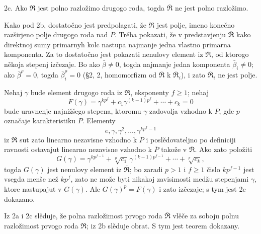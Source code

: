 \documentclass[11pt]{article}
\begin{document}
\setcounter{footnote}{22}

2c. Ako $\mathfrak R$ jest polno razložimo drugogo roda, togda $\overline{\mathfrak R}$ ne jest polno razložimo.

Kako pod 2b, dostatočno jest predpolagati, že $\mathfrak R$ jest polje, imeno konečno razširjeno polje drugogo roda nad $P$. Trěba pokazati, že v predstavjenju $\overline{\mathfrak R}$ kako direktnoj sumy primarnyh kolc nastupa najmanje jedna vlastno primarna komponenta. Za to dostatočno jest pokazati nenulovy element iz $\overline{\mathfrak R}$, od ktorogo někoja stepenj izčezaje. Bo ako $\bar\beta\ne0$, togda najmanje jedna komponenta $\bar\beta_i\ne0$; ako $\bar\beta^\rho=0$, togda $\bar\beta_i^\rho=0$ (\S 2, 2, homomorfizm od $\overline{\mathfrak R}$ k $\overline{\mathfrak R}_i$), i zato $\overline{\mathfrak R}_i$ ne jest polje.

Nehaj $\gamma$ bude element drugogo roda iz $\mathfrak R$, eksponenty $f\ge 1$; nehaj
\[
        F(\gamma)=\gamma^{kp^f}+c_1\gamma^{(k-1)p^f}+\cdots+c_k=0
\]
bude uravnenje najnižšego stepena, ktoromu $\gamma$ zadovolja vzhodno k $P$, gde $p$ označaje karakteristiku $P$. Elementy
\[
        e,\gamma,\gamma^2,\ldots,\gamma^{kp^f-1}
\]
iz $\mathfrak R$ sut zato linearno nezavisne vzhodno k $P$ i poslědovateljno po definiciji ravnosti ostavajut linearno nezavisne vzhodno k $\overline P$ takože v $\overline{\mathfrak R}$. Ako zato položiti
\[
        G(\gamma)=\gamma^{kp^{f-1}}+\sqrt[p]{c_1}\,\gamma^{(k-1)p^{f-1}}
        +\cdots+\sqrt[p]{c_k},
\]
togda $G(\gamma)$ jest nenulovy element iz $\overline{\mathfrak R}$; bo zaradi $p>1$ i $f\ge1$ čislo $kp^{f-1}$ jest vsegda menše než $kp^f$, zato ne može byti nikakoj zavisimosti medžu stepenjami $\gamma$, ktore nastupajut v $G(\gamma)$. Ale $G(\gamma)^p=F(\gamma)$ i zato izčezaje; s tym jest 2c dokazano.

Iz 2a i 2c slěduje, že polna razložimost prvogo roda $\overline{\mathfrak R}$ vlěče za soboju polnu razložimost prvogo roda $\mathfrak R$; iz 2b slěduje obrat. S tym jest teorem dokazany.
\end{document}
